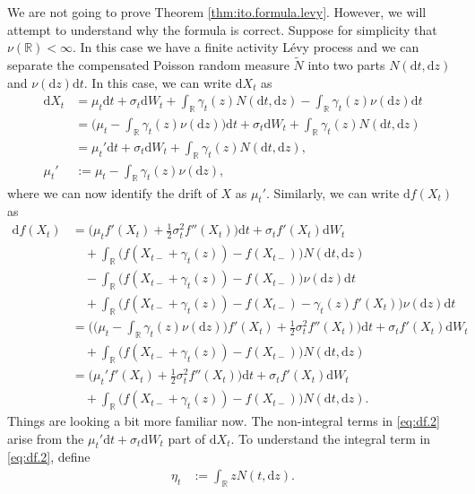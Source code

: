 \documentclass[12pt]{book}
\numberwithin{equation}{chapter}
\theoremstyle{plain}
\numberwithin{theorem}{section}
\theoremstyle{definition}
\numberwithin{exercise}{chapter}
\newcommand{\<}{\langle}
\renewcommand{\>}{\rangle}
\renewcommand{\(}{\left(}
\renewcommand{\)}{\right)}
\renewcommand{\[}{\left[}
\renewcommand{\]}{\right]}
\newcommand\Rb{\mathds{R}}
\newcommand\sig{\sigma}
\newcommand\gam{\gamma}
\newcommand\Nt{\widetilde{N}}
\newcommand\dd{\mathrm{d}}
\begin{document}
\noindent
We are not going to prove Theorem \ref{thm:ito.formula.levy}.  However, we will attempt to understand why the formula is correct.  Suppose for simplicity that $\nu(\Rb)< \infty$.  In this case we have a finite activity L\'evy process and we can separate the compensated Poisson random measure $\Nt$ into two parts  $N(\dd t, \dd z)$ and $\nu(\dd z)\dd t$.  In this case, we can write $\dd X_t$ as
\begin{align}
\dd X_t
	&=	\mu_t \dd t + \sig_t \dd W_t + \int_\Rb \gam_t(z) N( \dd t, \dd z) - \int_\Rb \gam_t(z) \nu( \dd z) \dd t \\
	&=	\Big( \mu_t - \int_\Rb \gam_t(z) \nu( \dd z) \Big)  \dd t + \sig_t \dd W_t + \int_\Rb \gam_t(z) N( \dd t, \dd z) \\
	&=	\mu_t' \dd t + \sig_t \dd W_t + \int_\Rb \gam_t(z) N( \dd t, \dd z) , \\
\mu_t'
	&:=	\mu_t - \int_\Rb \gam_t(z) \nu( \dd z) ,
\end{align}
where we can now identify the drift of $X$ as $\mu_t'$.
Similarly, we can write $\dd f(X_t)$ as
\begin{align}
\dd f(X_t)
	&=	\Big( \mu_t f'(X_t) + \tfrac{1}{2} \sig_t^2 f''(X_t) \Big) \dd t 
			+ \sig_t  f'(X_t) \dd W_t \\ &\quad
			+	\int_\Rb \Big( f\(X_{t-} + \gam_{t}(z) \) - f\(X_{t-}\) \Big) N( \dd t, \dd z) \\ &\quad
			- \int_\Rb \Big( f\(X_{t-} + \gam_{t}(z) \) - f\(X_{t-}\) \Big) \nu( \dd z) \dd t \\ &\quad
			+	\int_\Rb \Big( f\(X_{t-} + \gam_{t}(z) \) - f\(X_{t-}\) - \gam_{t}(z) f'(X_t) \Big) \nu(\dd z) \dd t \\
	&=	\bigg( \Big( \mu_t - \int_\Rb \gam_t(z) \nu(\dd z) \Big) f'(X_t)  + \tfrac{1}{2} \sig_t^2 f''(X_t) \bigg) \dd t 
			+ \sig_t f'(X_t) \dd W_t \\ &\quad
			+	\int_\Rb \Big( f\(X_{t-} + \gam_{t}(z) \) - f\(X_{t-}\) \Big) N( \dd t, \dd z) \\
	&=	\Big( \mu_t' f'(X_t) + \tfrac{1}{2} \sig_t^2 f''(X_t) \Big) \dd t 
			+ \sig_t f'(X_t) \dd W_t \\ &\quad
			+	\int_\Rb \Big( f\(X_{t-} + \gam_{t}(z) \) - f\(X_{t-}\) \Big) N( \dd t, \dd z) . \label{eq:df.2}
\end{align}
Things are looking a bit more familiar now.  The non-integral terms in \eqref{eq:df.2} arise from the $\mu_t' \dd t + \sig_t \dd W_t$ part of $\dd X_t$.  To understand the integral term in \eqref{eq:df.2}, define
\begin{align}
\eta_t
	&:=	\int_\Rb z N(t, \dd z) .
\end{align}
\end{document}
